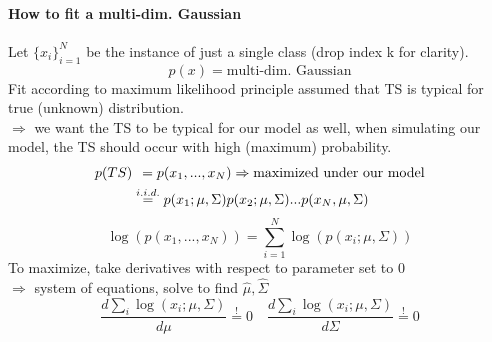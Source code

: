 \documentclass[11pt]{article}
\begin{document}
        \paragraph{How to fit a multi-dim. Gaussian}
          Let $\{ x_{i}\}_{i=1}^N$ be the instance of just a single class (drop
          index k for clarity).
          \begin{equation*}
            p(x) = \text{multi-dim. Gaussian}
          \end{equation*}
          Fit according to maximum likelihood principle assumed that TS is
          typical for true (unknown) distribution. \\
          $\Rightarrow$ we want the TS to be typical for our model as well,
          when simulating our model, the TS should occur with high (maximum)
          probability.
          \begin{equation*}
            \begin{align*}
              p(TS) &\hspace{1ex}= p(x_1,...,x_N) \Rightarrow \text{maximized under our model} \\
              &\stackrel{i.i.d.}{=} p(x_1;\mu,\Sigma)p(x_2;\mu,\Sigma)...p(x_N,\mu,\Sigma)
            \end{align*}
          \end{equation*}
          \begin{equation*}
            \log(p(x_1,...,x_N)) = \sum_{i=1}^{N}\log(p(x_i;\mu,\Sigma))
          \end{equation*}
          To maximize, take derivatives with respect to parameter set to 0 \\
          $\Rightarrow$ system of equations, solve to find
          $\hat{\mu}, \hat{\Sigma}$
          \begin{equation*}
            \frac{d\sum_i\log(x_i;\mu,\Sigma)}{d\mu} \stackrel{!}{=} 0 \quad
            \frac{d\sum_i\log(x_i;\mu,\Sigma)}{d\Sigma} \stackrel{!}{=} 0
          \end{equation*}
\end{document}
